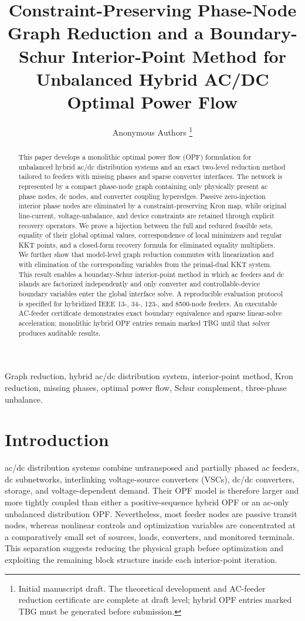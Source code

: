 \documentclass[journal,10pt]{IEEEtran}
\title{Constraint-Preserving Phase-Node Graph Reduction and a Boundary-Schur Interior-Point Method for Unbalanced Hybrid AC/DC Optimal Power Flow}
\author{Anonymous Authors%
\thanks{Initial manuscript draft. The theoretical development and AC-feeder reduction certificate are complete at draft level; hybrid OPF entries marked TBG must be generated before submission.}}
\begin{document}
\maketitle

\begin{abstract}
This paper develops a monolithic optimal power flow (OPF) formulation for
unbalanced hybrid ac/dc distribution systems and an exact two-level reduction
method tailored to feeders with missing phases and sparse converter interfaces.
The network is represented by a compact phase-node graph containing only
physically present ac phase nodes, dc nodes, and converter coupling hyperedges.
Passive zero-injection interior phase nodes are eliminated by a
constraint-preserving Kron map, while original line-current, voltage-unbalance,
and device constraints are retained through explicit recovery operators.  We
prove a bijection between the full and reduced feasible sets, equality of their
global optimal values, correspondence of local minimizers and regular KKT
points, and a closed-form recovery formula for eliminated equality multipliers.
We further show that model-level graph reduction commutes with linearization and
with elimination of the corresponding variables from the primal-dual KKT
system.  This result enables a boundary-Schur interior-point method in which ac
feeders and dc islands are factorized independently and only converter and
controllable-device boundary variables enter the global interface solve.  A
reproducible evaluation protocol is specified for hybridized IEEE 13-, 34-,
123-, and 8500-node feeders.  An executable AC-feeder certificate demonstrates
exact boundary equivalence and sparse linear-solve acceleration; monolithic
hybrid OPF entries remain marked TBG until that solver produces auditable
results.
\end{abstract}

\begin{IEEEkeywords}
Graph reduction, hybrid ac/dc distribution system, interior-point method,
Kron reduction, missing phases, optimal power flow, Schur complement,
three-phase unbalance.
\end{IEEEkeywords}

\section{Introduction}
 ac/dc distribution systems combine untransposed and
partially phased ac feeders, dc subnetworks, interlinking voltage-source
converters (VSCs), dc/dc converters, storage, and voltage-dependent demand.
Their OPF model is therefore larger and more tightly coupled than either a
positive-sequence hybrid OPF or an ac-only unbalanced distribution OPF.
Nevertheless, most feeder nodes are passive transit nodes, whereas nonlinear
controls and optimization variables are concentrated at a comparatively small
set of sources, loads, converters, and monitored terminals.  This separation
suggests reducing the physical graph before optimization and exploiting the
remaining block structure inside each interior-point iteration.
\end{document}

